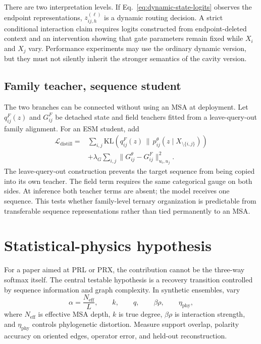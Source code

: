 \documentclass[10pt,twocolumn]{article}
\newcommand{\KL}{\mathrm{KL}}
\newcommand{\1}{\mathbf 1}
\theoremstyle{remark}
\begin{document}
There are two interpretation levels.  If Eq.~\ref{eq:dynamic-state-logits} observes the endpoint
representations, $z_{ij,h}^{(\ell)}$ is a dynamic routing decision.  A strict conditional
interaction claim requires logits constructed from endpoint-deleted context and an intervention
showing that gate parameters remain fixed while $X_i$ and $X_j$ vary.  Performance experiments may
use the ordinary dynamic version, but they must not silently inherit the stronger semantics of the
cavity version.

\subsection{Family teacher, sequence student}

The two branches can be connected without using an MSA at deployment.  Let $q_{ij}^{F}(z)$ and
$G_{ij}^{F}$ be detached state and field teachers fitted from a leave-query-out family alignment.
For an ESM student, add
\begin{equation}
\begin{split}
\mathcal L_{\mathrm{distill}}
={}&\sum_{i,j}\KL\!\left(
q_{ij}^{F}(z)\,\|\,
p_{ij}^{\theta}(z\mid X_{\setminus\{i,j\}})
\right)\\
&+\lambda_G\sum_{i,j}
\|G_{ij}^{\theta}-G_{ij}^{F}\|_{u_i,u_j}^2.
\end{split}
\label{eq:family-student-distillation}
\end{equation}
The leave-query-out construction prevents the target sequence from being copied into its own
teacher.  The field term requires the same categorical gauge on both sides.  At inference both
teacher terms are absent; the model receives one sequence.  This tests whether family-level
ternary organization is predictable from transferable sequence representations rather than tied
permanently to an MSA.

\section{Statistical-physics hypothesis}

For a paper aimed at PRL or PRX, the contribution cannot be the three-way softmax itself.  The
central testable hypothesis is a recovery transition controlled by sequence information and graph
complexity.  In synthetic ensembles, vary
\begin{equation}
\alpha=\frac{N_{\mathrm{eff}}}{L},\qquad
k,\qquad q,\qquad
\beta\rho,\qquad
\eta_{\mathrm{phy}},
\label{eq:control-variables}
\end{equation}
where $N_{\mathrm{eff}}$ is effective MSA depth, $k$ is true degree, $\beta\rho$ is interaction
strength, and $\eta_{\mathrm{phy}}$ controls phylogenetic distortion.  Measure support overlap,
polarity accuracy on oriented edges, operator error, and held-out reconstruction.
\end{document}
